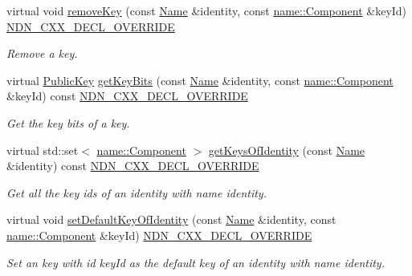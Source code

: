 \begin{DoxyCompactItemize}
virtual void \hyperlink{classndn_1_1security_1_1PibMemory_acb97cb72374f5ca6fc7e72e378227ad7}{remove\+Key} (const \hyperlink{classndn_1_1Name}{Name} \&identity, const \hyperlink{classndn_1_1name_1_1Component}{name\+::\+Component} \&key\+Id) \hyperlink{ndn-cxx_2src_2common_8hpp_a901daa44edd42d3f44df61d77277d57f}{N\+D\+N\+\_\+\+C\+X\+X\+\_\+\+D\+E\+C\+L\+\_\+\+O\+V\+E\+R\+R\+I\+DE}
\begin{DoxyCompactList}\small\item\em Remove a key. \end{DoxyCompactList}\item 
virtual \hyperlink{classndn_1_1PublicKey}{Public\+Key} \hyperlink{classndn_1_1security_1_1PibMemory_addce370c18992ba81514c43be3f03a0e}{get\+Key\+Bits} (const \hyperlink{classndn_1_1Name}{Name} \&identity, const \hyperlink{classndn_1_1name_1_1Component}{name\+::\+Component} \&key\+Id) const \hyperlink{ndn-cxx_2src_2common_8hpp_a901daa44edd42d3f44df61d77277d57f}{N\+D\+N\+\_\+\+C\+X\+X\+\_\+\+D\+E\+C\+L\+\_\+\+O\+V\+E\+R\+R\+I\+DE}
\begin{DoxyCompactList}\small\item\em Get the key bits of a key. \end{DoxyCompactList}\item 
virtual std\+::set$<$ \hyperlink{classndn_1_1name_1_1Component}{name\+::\+Component} $>$ \hyperlink{classndn_1_1security_1_1PibMemory_ab991468dc2995663fb001d8198c47000}{get\+Keys\+Of\+Identity} (const \hyperlink{classndn_1_1Name}{Name} \&identity) const \hyperlink{ndn-cxx_2src_2common_8hpp_a901daa44edd42d3f44df61d77277d57f}{N\+D\+N\+\_\+\+C\+X\+X\+\_\+\+D\+E\+C\+L\+\_\+\+O\+V\+E\+R\+R\+I\+DE}
\begin{DoxyCompactList}\small\item\em Get all the key ids of an identity with name {\ttfamily identity}. \end{DoxyCompactList}\item 
virtual void \hyperlink{classndn_1_1security_1_1PibMemory_aa6ef116cabee1e24e53674b9fec505f3}{set\+Default\+Key\+Of\+Identity} (const \hyperlink{classndn_1_1Name}{Name} \&identity, const \hyperlink{classndn_1_1name_1_1Component}{name\+::\+Component} \&key\+Id) \hyperlink{ndn-cxx_2src_2common_8hpp_a901daa44edd42d3f44df61d77277d57f}{N\+D\+N\+\_\+\+C\+X\+X\+\_\+\+D\+E\+C\+L\+\_\+\+O\+V\+E\+R\+R\+I\+DE}
\begin{DoxyCompactList}\small\item\em Set an key with id {\ttfamily key\+Id} as the default key of an identity with name {\ttfamily identity}. \end{DoxyCompactList}\item 

\end{DoxyCompactItemize}
